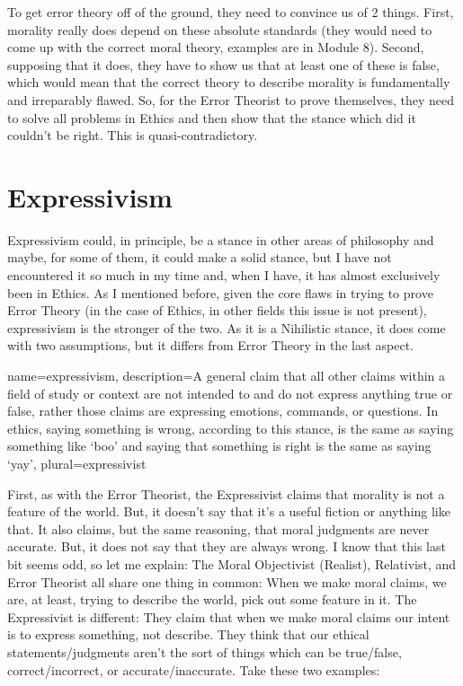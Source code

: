 To get error theory off of the ground, they need to convince us of 2 things. First, morality really does depend on these absolute standards (they would need to come up with the correct moral theory, examples are in Module 8). Second, supposing that it does, they have to show us that at least one of these is false, which would mean that the correct theory to describe morality is fundamentally and irreparably flawed. So, for the Error Theorist to prove themselves, they need to solve all problems in Ethics and then show that the stance which did it couldn't be right. This is quasi-contradictory.

\chapter{Expressivism}

Expressivism could, in principle, be a stance in other areas of philosophy and maybe, for some of them, it could make a solid stance, but I have not encountered it so much in my time and, when I have, it has almost exclusively been in Ethics. As I mentioned before, given the core flaws in trying to prove Error Theory (in the case of Ethics, in other fields this issue is not present), 
\Gls{expressivism} is the stronger of the two. As it is a Nihilistic stance, it does come with two assumptions, but it differs from Error Theory in the last aspect.

{
  name=expressivism,
  description={A general claim that all other claims within a field of study or context are not intended to and do not express anything true or false, rather those claims are expressing emotions, commands, or questions. In ethics, saying something is wrong, according to this stance, is the same as saying something like `boo' and saying that something is right is the same as saying `yay'},
plural=expressivist
}


First, as with the Error Theorist, the Expressivist claims that morality is not a feature of the world. But, it doesn't say that it's a useful fiction or anything like that. It also claims, but the same reasoning, that moral judgments are never accurate. But, it does not say that they are always wrong. I know that this last bit seems odd, so let me explain: The Moral Objectivist (Realist), Relativist, and Error Theorist all share one thing in common: When we make moral claims, we are, at least, trying to describe the world, pick out some feature in it. The Expressivist is different: They claim that when we make moral claims our intent is to express something, not describe. They think that our ethical statements/judgments aren't the sort of things which can be true/false, correct/incorrect, or accurate/inaccurate. Take these two examples: 

